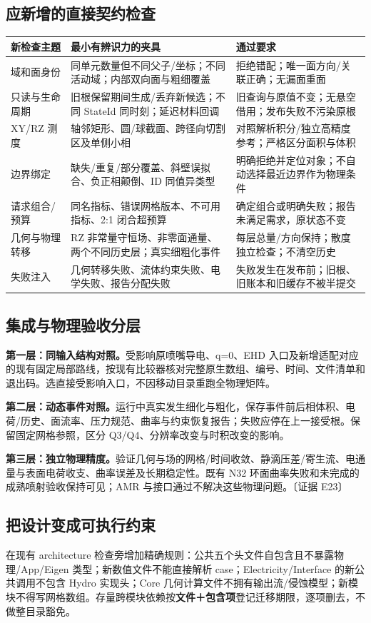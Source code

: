 \documentclass[UTF8,a4paper,11pt,fontset=fandol]{ctexart}
\newcommand{\ev}[1]{{\small\color{muted}〔证据 #1〕}}
\begin{document}
\subsection{应新增的直接契约检查}
\begin{longtable}{@{}P{.21\textwidth}P{.46\textwidth}P{.27\textwidth}@{}}
\toprule 新检查主题 & 最小有辨识力的夹具 & 通过要求\\\midrule\endhead
域和面身份 & 同单元数量但不同父子/坐标；不同活动域；内部双向面与粗细覆盖 & 拒绝错配；唯一面方向/关联正确；无漏面重面\\
只读与生命周期 & 旧根保留期间生成/丢弃新候选；不同 StateId 同时刻；延迟材料回调 & 旧查询与原值不变；无悬空借用；发布失败不污染原根\\
XY/RZ 测度 & 轴邻矩形、圆/球截面、跨径向切割区及单侧小相 & 对照解析积分/独立高精度参考；严格区分面积与体积\\
边界绑定 & 缺失/重复/部分覆盖、斜壁误拟合、负正相颠倒、ID 同值异类型 & 明确拒绝并定位对象；不自动选择最近边界作为物理条件\\
请求组合/预算 & 同名指标、错误网格版本、不可用指标、2:1 闭合超预算 & 确定组合或明确失败；报告未满足需求，原状态不变\\
几何与物理转移 & RZ 非常量守恒场、非零面通量、两个不同历史层；真实细粗化事件 & 每层总量/方向保持；散度独立检查；不清空历史\\
失败注入 & 几何转移失败、流体约束失败、电学失败、报告分配失败 & 失败发生在发布前；旧根、旧账本和旧缓存不被半提交\\
\bottomrule
\end{longtable}

\subsection{集成与物理验收分层}
\textbf{第一层：同输入结构对照。}受影响原喷嘴导电、q=0、EHD 入口及新增适配对应的现有固定局部路线，按现有比较器核对完整原生数组、编号、时间、文件清单和退出码。选直接受影响入口，不因移动目录重跑全物理矩阵。

\textbf{第二层：动态事件对照。}运行中真实发生细化与粗化，保存事件前后相体积、电荷/历史、面流率、压力规范、曲率与约束恢复报告；失败应停在上一接受根。保留固定网格参照，区分 Q3/Q4、分辨率改变与时积改变的影响。

\textbf{第三层：独立物理精度。}验证几何与场的网格/时间收敛、静滴压差/寄生流、电通量与表面电荷收支、曲率误差及长期稳定性。既有 N32 环面曲率失败和未完成的成熟喷射验收保持可见；AMR 与接口通过不解决这些物理问题。\ev{E23}

\subsection{把设计变成可执行约束}
在现有 architecture 检查旁增加精确规则：公共五个头文件自包含且不暴露物理/App/Eigen 类型；新数值文件不能直接解析 case；Electricity/Interface 的新公共调用不包含 Hydro 实现头；Core 几何计算文件不拥有输出流/侵蚀模型；新模块不得写网格数组。存量跨模块依赖按\textbf{文件＋包含项}登记迁移期限，逐项删去，不做整目录豁免。
\end{document}
